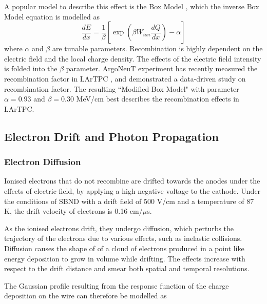 A popular model to describe this effect is the Box Model \cite{}, which the inverse Box Model equation is modelled as \cite{}
\begin{equation}
	\frac{dE}{dx} = \frac{1}{\beta}\left[ \exp{\left( \beta W_{ion}  \frac{dQ}{dx}\right)} -\alpha \right]
\end{equation}
where $\alpha$ and $\beta$ are tunable parameters.
Recombination is highly dependent on the electric field and the local charge density.
The effects of the electric field intensity is folded into the $\beta$ parameter.
ArgoNeuT experiment has recently measured the recombination factor in LArTPC \cite{}, and demonstrated a data-driven study on recombination factor.
The resulting ``Modified Box Model" with parameter $\alpha = 0.93$ and $\beta = 0.30 $ MeV/cm best describes the recombination effects in LArTPC.

\subsection{Electron Drift and Photon Propagation}
\label{sec3:propagration}


\subsubsection{Electron Diffusion}

Ionised electrons that do not recombine are drifted towards the anodes under the effects of electric field, by applying a high negative voltage to the cathode.
Under the conditions of SBND with a drift field of 500 V/cm and a temperature of 87 K, the drift velocity of electrons is 0.16 cm/$\mu$s.

As the ionised electrons drift, they undergo diffusion, which perturbs the trajectory of the electrons due to various effects, such as inelastic collisions.
Diffusion causes the shape of of a cloud of electrons produced in a point like energy deposition to grow in volume while drifting.
The effects increase with respect to the drift distance and smear both spatial and temporal resolutions.

The Gaussian profile resulting from the response function of the charge deposition on the wire can therefore be modelled as 


